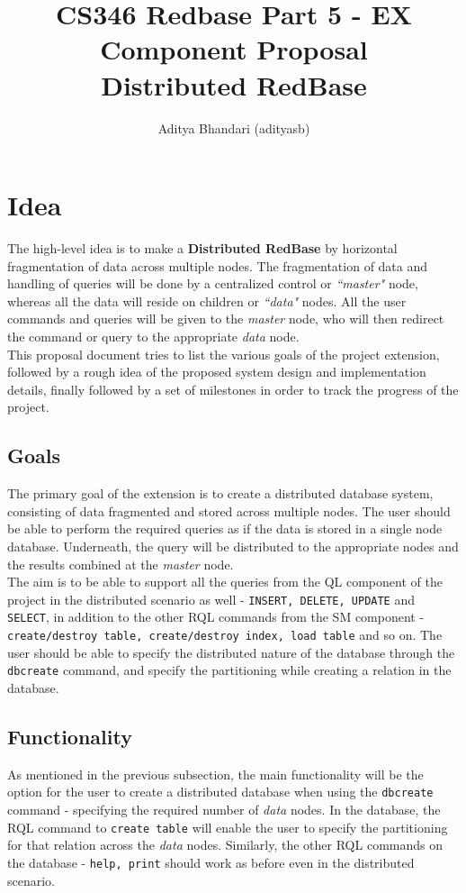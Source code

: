 \documentclass[letterpaper,11pt]{article}
\title{CS346 Redbase Part 5 - EX Component Proposal \\ Distributed RedBase}
\author{Aditya Bhandari (adityasb)}
\date{}
\begin{document}
\maketitle
\vspace{-1cm}

\section{Idea}
The high-level idea is to make a \textbf{Distributed RedBase} by horizontal fragmentation of data across
multiple nodes. The fragmentation of data and handling of queries will be done by a centralized
control or \textit{``master"} node, whereas all the data will reside on children or \textit{``data"}
nodes. All the user commands and queries will be given to the \textit{master} node, who will then
redirect the command or query to the appropriate \textit{data} node.\\

This proposal document tries to list the various goals of the project extension, followed by a rough
idea of the proposed system design and implementation details, finally followed by a set of milestones
in order to track the progress of the project.

\subsection{Goals}
The primary goal of the extension is to create a distributed database system, consisting of data
fragmented and stored across multiple nodes. The user should be able to perform the required queries
as if the data is stored in a single node database. Underneath, the query will be distributed to the
appropriate nodes and the results combined at the \textit{master} node.\\

The aim is to be able to support all the queries from the QL component of the project in the
distributed scenario as well - \texttt{INSERT, DELETE, UPDATE} and \texttt{SELECT}, in addition to
the other RQL commands from the SM component - \texttt{create/destroy table, create/destroy index,
load table} and so on. The user should be able to specify the distributed nature of the database
through the \texttt{dbcreate} command, and specify the partitioning while creating a relation in the
database.

\subsection{Functionality}
As mentioned in the previous subsection, the main functionality will be the option for the user to
create a distributed database when using the \texttt{dbcreate} command - specifying the required
number of \textit{data} nodes. In the database, the RQL command to \texttt{create table} will enable
the user to specify the partitioning for that relation across the \textit{data} nodes. Similarly,
the other RQL commands on the database - \texttt{help, print} should work as before even in the
distributed scenario.\\
\end{document}
